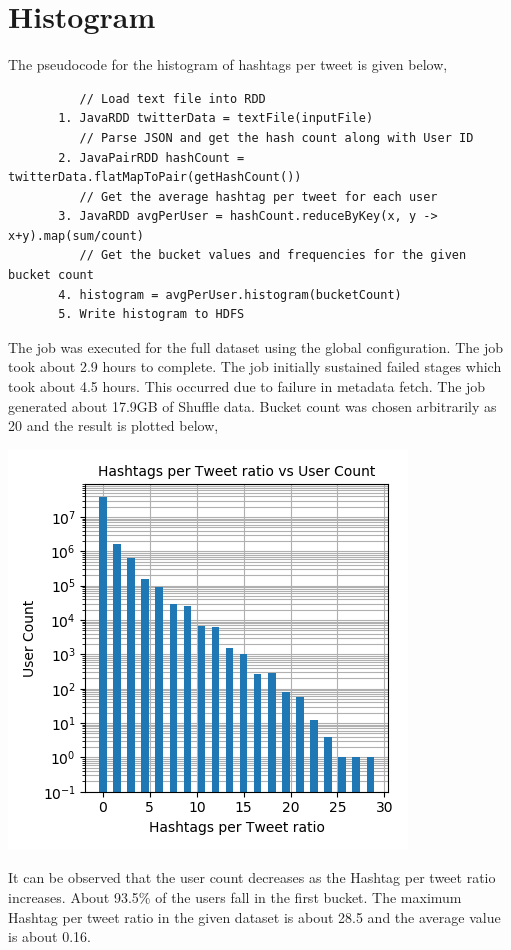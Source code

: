 \documentclass[11pt,a4paper,oneside]{article}
\begin{document}
    \section{Histogram}
    The pseudocode for the histogram of hashtags per tweet is given below,
    
    \begin{verbatim} 
          // Load text file into RDD
       1. JavaRDD twitterData = textFile(inputFile)
          // Parse JSON and get the hash count along with User ID
       2. JavaPairRDD hashCount = twitterData.flatMapToPair(getHashCount()) 
          // Get the average hashtag per tweet for each user
       3. JavaRDD avgPerUser = hashCount.reduceByKey(x, y -> x+y).map(sum/count)
          // Get the bucket values and frequencies for the given bucket count
       4. histogram = avgPerUser.histogram(bucketCount)
       5. Write histogram to HDFS     
    \end{verbatim}    
    The job was executed for the full dataset using the global configuration. The job took about 2.9 hours to complete. The job initially sustained failed stages which took about 4.5 hours. This occurred due to failure in metadata fetch. The job generated about 17.9GB of Shuffle data. Bucket count was chosen arbitrarily as 20 and the result is plotted below,
    
    \begin{center}
    	\includegraphics[scale=0.6]{1.png}		
    \end{center}

	It can be observed that the user count decreases as the Hashtag per tweet ratio increases. About 93.5\% of the users fall in the first bucket. The maximum Hashtag per tweet ratio in the given dataset is about 28.5 and the average value is about 0.16.
	
\end{document}
